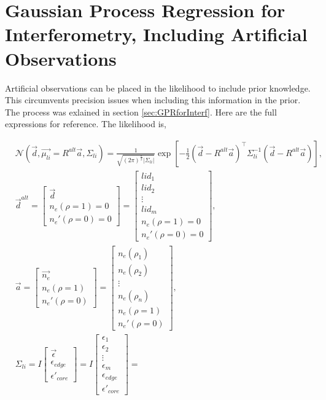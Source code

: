\section{Gaussian Process Regression for Interferometry, Including Artificial Observations}

Artificial observations can be placed in the likelihood to include prior knowledge. This circumvents precision issues when including this information in the prior. The process was exlained in section \ref{sec:GPRforInterf}. Here are the full expressions for reference. The likelihood is,

$$
\begin{aligned}
&\mathcal{N}(\vec{d}, \vec{\mu_{li}} = R^{alt}\vec{a}, \Sigma_{li}) = \frac{1}{\sqrt{(2\pi)^{\frac{n}{2}}|\Sigma_{li}|}} \exp \left[{{-\frac{1}{2}(\vec{d}-R^{alt}\vec{a})^\top\Sigma_{li}^{-1}(\vec{d}-R^{alt}\vec{a})}}\right],\\
&\vec d^{alt} = \begin{bmatrix} \vec{d}\\ n_e(\rho=1)=0\\ n_e'(\rho=0)=0 \end{bmatrix} = \begin{bmatrix} lid_1\\ lid_2 \\ \vdots \\ lid_m \\ n_e(\rho=1)=0\\ n_e'(\rho=0)=0 \end{bmatrix}, \\
&\vec a = \begin{bmatrix} \vec{n_e}\\ n_e(\rho=1)\\ n_e'(\rho=0) \end{bmatrix} = \begin{bmatrix} n_e(\rho_1)\\ n_e(\rho_2) \\ \vdots \\ n_e(\rho_n) \\ n_e(\rho=1)\\ n_e'(\rho=0) \end{bmatrix}, \\
&\Sigma_{li} = I\begin{bmatrix}\vec{\epsilon} \\ \epsilon_{edge} \\ \epsilon'_{core}\end{bmatrix} = I\begin{bmatrix}\epsilon_1 \\ \epsilon_2 \\ \vdots \\ \epsilon_m \\ \epsilon_{edge} \\ \epsilon'_{core}\end{bmatrix} =

\end{aligned}$$
